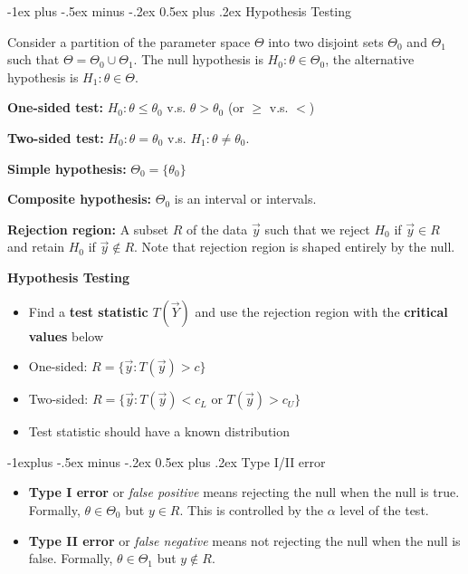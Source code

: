 \documentclass[10pt,landscape]{article}
\makeatletter
\renewcommand{\section}{\@startsection{section}{1}{0mm}%
                                {-1ex plus -.5ex minus -.2ex}%
                                {0.5ex plus .2ex}%
                                {\normalfont\large\bfseries}}
\renewcommand{\subsection}{\@startsection{subsection}{2}{0mm}%
                                {-1explus -.5ex minus -.2ex}%
                                {0.5ex plus .2ex}%
                                {\normalfont\normalsize\bfseries}}
\makeatother
\begin{document}
\begin{multicols*}{3}
\section{Hypothesis Testing}

Consider a partition of the parameter space $\Theta$ into two disjoint sets $\Theta_0$ and $\Theta_1$ such that $\Theta=\Theta_0\cup \Theta_1$. The null hypothesis is $H_0:\theta\in\Theta_0$, the alternative hypothesis is $H_1:\theta\in\Theta$.

\textbf{One-sided test: }$H_0:\theta\leq\theta_0$ v.s. $\theta>\theta_0$ (or $\geq$ v.s. $<$)

\textbf{Two-sided test: }$H_0:\theta=\theta_0$ v.s. $H_1:\theta\neq\theta_0$.

\textbf{Simple hypothesis: }$\Theta_0=\{\theta_0\}$

\textbf{Composite hypothesis: }$\Theta_0$ is an interval or intervals.

\textbf{Rejection region:} A subset $R$ of the data $\vec{y}$ such that we reject $H_0$ if $\vec{y}\in R$ and retain $H_0$ if $\vec{y}\not\in R$. Note that rejection region is shaped entirely by the null.

\textbf{Hypothesis Testing}
\begin{itemize}
    \item Find a \textbf{test statistic} $T(\vec{Y})$ and use the rejection region with the \textbf{critical values} below
    \item One-sided: $R=\{\vec{y}:T(\vec{y})>c\}$
    \item Two-sided: $R=\{\vec{y}:T(\vec{y})<c_L\text{ or }T(\vec{y})>c_U\}$
    \item Test statistic should have a known distribution
\end{itemize}


\subsection{Type I/II error}
\begin{itemize}
    \item \textbf{Type I error} or \emph{false positive} means rejecting the null when the null is true. Formally, $\theta \in \Theta_0$ but $y \in R$. This is controlled by the $\alpha$ level of the test.
    \item \textbf{Type II error} or \emph{false negative} means not rejecting the null when the null is false. Formally, $\theta \in \Theta_1$ but $y \not\in R$.
\end{itemize}


\end{multicols*}
\end{document}
